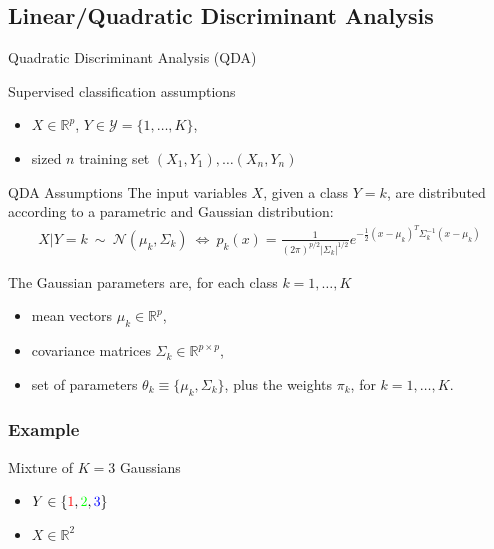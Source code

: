 \subsection{Linear/Quadratic Discriminant Analysis}


\begin{frame}{Quadratic Discriminant Analysis (QDA)}
\begin{block}{Supervised classification assumptions}
 \begin{itemize}
  \item $X \in \mathbb{R}^p$, $Y \in \mathcal{Y}=\{1,\ldots,K\}$,
  \item sized $n$ training set $(X_1,Y_1), \ldots (X_n,Y_n)$
 \end{itemize}
\end{block}

\begin{block}{QDA Assumptions}
The input variables $X$, given a class $Y=k$, are distributed according to a parametric and Gaussian distribution:
\begin{align*}
 X|Y=k \ \sim \ \mathcal{N}(\mu_k,\Sigma_k) \  \Leftrightarrow \ p_k(x)= \frac{1}{(2 \pi)^{p/2} |\Sigma_k|^{1/2}}e^{-\frac{1}{2}
 (x-\mu_k)^T \Sigma_k^{-1} (x-\mu_k)}
\end{align*}
\end{block}
The Gaussian parameters are, for each class $k=1,\ldots,K$
\begin{itemize}
 \item mean vectors $\mu_k \in \mathbb{R}^p$,
 \item covariance matrices $\Sigma_k \in \mathbb{R}^{p \times p}$,
 \item[\doigt] set of parameters $\theta_k \equiv \{\mu_k, \Sigma_k\}$, plus the weights $\pi_k$, for $k=1,\ldots,K$.
\end{itemize}

\end{frame}



\begin{frame}
  \frametitle{Example}
\begin{block}{Mixture of $K=3$ Gaussians}
\begin{itemize}
   \item $Y \in \{\textcolor{red}{1},\textcolor{green}{2},\textcolor{blue}{3}\}$
   \item $X \in \mathbb{R}^2$
\end{itemize}
\end{block}




\end{frame}




